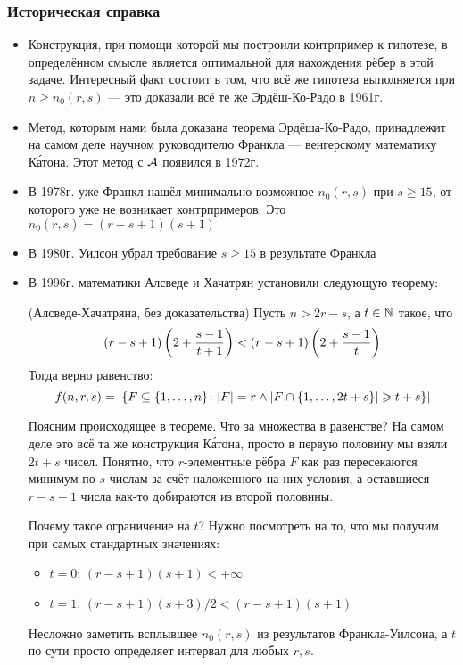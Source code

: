 \subsubsection*{Историческая справка}

\begin{itemize}
	\item Конструкция, при помощи которой мы построили контрпример к гипотезе, в определённом смысле является оптимальной для нахождения рёбер в этой задаче. Интересный факт состоит в том, что всё же гипотеза выполняется при $n \ge n_0(r, s)$ --- это доказали всё те же Эрдёш-Ко-Радо в 1961г.
	
	\item Метод, которым нами была доказана теорема Эрдёша-Ко-Радо, принадлежит на самом деле научном руководителю Франкла --- венгерскому математику К\'{а}тона. Этот метод с $\mathcal{A}$ появился в 1972г.
	
	\item В 1978г. уже Франкл нашёл минимально возможное $n_0(r, s)$ при $s \ge 15$, от которого уже не возникает контрпримеров. Это $n_0(r, s) = (r - s + 1)(s + 1)$
	
	\item В 1980г. Уилсон убрал требование $s \ge 15$ в результате Франкла
	
	\item В 1996г. математики Алсведе и Хачатрян установили следующую теорему:
	\begin{theorem} (Алсведе-Хачатряна, без доказательства)
		Пусть $n > 2r - s$, а $t \in \mathbb{N}$ такое, что
		\[
			(r - s + 1)\left(2 + \frac{s - 1}{t + 1}\right) < (r - s + 1)\left(2 + \frac{s - 1}{t}\right)
		\]
		Тогда верно равенство:
		\[
			f(n, r, s) = |\{F \subseteq \{1, \ldots, n\} \colon |F| = r \wedge |F \cap \{1, \ldots, 2t + s\}| \geqslant t + s\}|
		\]
	\end{theorem}

	\begin{note}
		Поясним происходящее в теореме. Что за множества в равенстве? На самом деле это всё та же конструкция К\'{а}тона, просто в первую половину мы взяли $2t + s$ чисел. Понятно, что $r$-элементные рёбра $F$ как раз пересекаются минимум по $s$ числам за счёт наложенного на них условия, а оставшиеся $r - s - 1$ числа как-то добираются из второй половины.
		
		Почему такое ограничение на $t$? Нужно посмотреть на то, что мы получим при самых стандартных значениях:
		\begin{itemize}
			\item $t = 0$: \((r - s + 1)(s + 1) < +\infty\)
			
			\item $t = 1$: \((r - s + 1)(s + 3) / 2 < (r - s + 1)(s + 1)\)
		\end{itemize}
		Несложно заметить всплывшее $n_0(r, s)$ из результатов Франкла-Уилсона, а $t$ по сути просто определяет интервал для любых $r, s$.
	\end{note}
\end{itemize}

